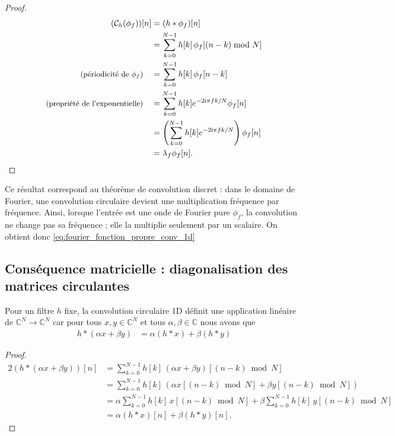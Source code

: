 \begin{proof}
\begin{alignat*}{2}
    (\mathcal{C}_h(\phi_f))[n] &= (h * \phi_f)[n] \\
    &= \sum_{k=0}^{N-1} h[k]\,\phi_f[(n-k) \bmod N] \\
    \text{\small (périodicité de $\phi_f$)} \quad &= \sum_{k=0}^{N-1} h[k]\,\phi_f[n-k] \\
    \text{\small (propriété de l'exponentielle)} \quad &= \sum_{k=0}^{N-1} h[k] e^{-2\mathrm{i}\pi f k/N}\phi_f[n] \\
    &= \left(\sum_{k=0}^{N-1} h[k] e^{-2\mathrm{i}\pi f k/N}\right)\phi_f[n] \\
    &= \lambda_f \phi_f[n].
\end{alignat*}

\end{proof}

Ce résultat correspond au théorème de convolution discret : dans le domaine de Fourier,
une convolution circulaire devient une multiplication fréquence par fréquence. Ainsi,
lorsque l'entrée est une onde de Fourier pure \(\phi_f\), la convolution ne change pas
sa fréquence ; elle la multiplie seulement par un scalaire. On obtient donc \ref{eq:fourier_fonction_propre_conv_1d}

\subsection{Conséquence matricielle : diagonalisation des matrices circulantes}

Pour un filtre $h$ fixe, la convolution circulaire 1D définit une application linéaire de $\mathbb{C}^N \rightarrow \mathbb{C}^N$
car pour tous $x, y \in \mathbb{C}^N$ et tous $\alpha, \beta \in \mathbb{C}$ nous avons que
\begin{align*}
h * (\alpha x + \beta y) &= \alpha (h * x) + \beta (h * y)
\end{align*}

\begin{proof}
\begin{alignat*}{2}
    (h * (\alpha x + \beta y))[n] &= \sum_{k=0}^{N-1} h[k]\,(\alpha x + \beta y)[(n-k) \bmod N]  \\
    &= \sum_{k=0}^{N-1} h[k]\,(\alpha x[(n-k) \bmod N] + \beta y[(n-k) \bmod N])  \\
    &= \alpha \sum_{k=0}^{N-1} h[k]\,x[(n-k) \bmod N] + \beta \sum_{k=0}^{N-1} h[k]\,y[(n-k) \bmod N]  \\
    &= \alpha (h * x)[n] + \beta (h * y)[n].
\end{alignat*}

\end{proof}


